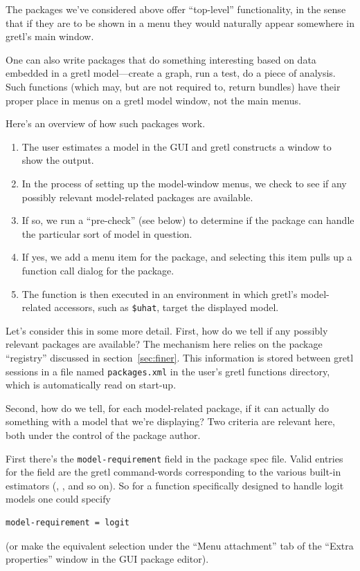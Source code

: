 \documentclass[oneside]{book}
\begin{document}
The packages we've considered above offer ``top-level'' functionality,
in the sense that if they are to be shown in a menu they would
naturally appear somewhere in gretl's main window.

One can also write packages that do something interesting based on
data embedded in a gretl model---create a graph, run a test, do a
piece of analysis. Such functions (which may, but are not required to,
return bundles) have their proper place in menus on a gretl model
window, not the main menus.

Here's an overview of how such packages work.

\begin{enumerate}
\item The user estimates a model in the GUI and gretl constructs a
  window to show the output.
\item In the process of setting up the model-window menus, we check to
  see if any possibly relevant model-related packages are available.
\item If so, we run a ``pre-check'' (see below) to determine
  if the package can handle the particular sort of model in
  question.
\item If yes, we add a menu item for the package, and selecting this
  item pulls up a function call dialog for the package.
\item The function is then executed in an environment in which gretl's
  model-related accessors, such as \verb|$uhat|, target the displayed
  model.%
\end{enumerate}

Let's consider this in some more detail.  First, how do we tell if any
possibly relevant packages are available? The mechanism here relies on
the package ``registry'' discussed in section~\ref{sec:finer}. This
information is stored between gretl sessions in a file named
\texttt{packages.xml} in the user's gretl functions directory, which
is automatically read on start-up.

Second, how do we tell, for each model-related package, if it can
actually do something with a model that we're displaying? Two criteria
are relevant here, both under the control of the package author.

First there's the \texttt{model-requirement} field in the package
\textsf{spec} file. Valid entries for the field are the gretl
command-words corresponding to the various built-in estimators
(, ,  and so on). So for a function
specifically designed to handle logit models one could specify
\begin{verbatim}
model-requirement = logit
\end{verbatim}
(or make the equivalent selection under the ``Menu attachment'' tab of
the ``Extra properties'' window in the GUI package editor).
\end{document}
